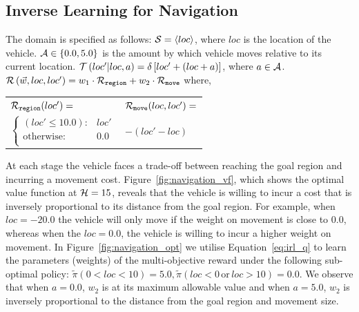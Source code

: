 \subsection{Inverse Learning for Navigation}
\label{sec:results_navigation}

The domain is specified as follows: {\footnotesize $ \mathcal{S} = \left\langle loc \right\rangle$}, where $ loc $ is the location of the vehicle. {\footnotesize $ \mathcal{A} \in \left\lbrace 0.0, 5.0 \right\rbrace $} is the amount by which vehicle moves relative to its current location. {\footnotesize $ \mathcal{T}\left( loc' | loc, a \right) = \delta \left[ loc' + (loc + a) \right] $}, where {\footnotesize $ a \in \mathcal{A} $}. {\footnotesize $ \mathcal{R}\left(\vec{w}, loc, loc'\right) = w_1 \cdot \mathcal{R}_{\mathtt{region}} + w_2 \cdot \mathcal{R}_{\mathtt{move}} $} where,

{\footnotesize 
    \abovedisplayskip=10pt
    \belowdisplayskip=0pt
    \renewcommand{\arraystretch}{1.5}
    \begin{tabular}{ll}    
        $ \mathcal{R}_{\mathtt{region}}(loc') = $ &  $ \mathcal{R}_{\mathtt{move}}(loc, loc') =  $ \\
        \qquad $ \begin{cases}
        (loc' \leq 10.0 ) : 				& loc' \\
        \text{otherwise} : 					& 0.0 \\
        \end{cases} $ 						& \qquad $ - (loc' - loc)  $\\
    \end{tabular}
} 

At each stage the vehicle faces a trade-off between reaching the goal region and incurring a movement cost. Figure~\ref{fig:navigation_vf}, which shows the optimal value function at {\footnotesize$ \mathcal{H} = 15 $}, reveals that the vehicle is willing to incur a cost that is inversely proportional to its distance from the goal region. For example, when {\footnotesize $loc = -20.0$} the vehicle will only move if the weight on movement is close to {\footnotesize $0.0$}, whereas when the {\footnotesize $loc = 0.0$}, the vehicle is willing to incur a higher weight on movement. In Figure~\ref{fig:navigation_opt} we utilise Equation~\eqref{eq:irl_q} to learn the parameters (weights) of the multi-objective reward under the following sub-optimal policy: {\footnotesize $ \tilde{\pi}(0 < loc < 10) = 5.0,  \tilde{\pi}(loc < 0 \,\mathrm{or}\, loc > 10) = 0.0$}. We observe that when {\footnotesize $a = 0.0$}, {\footnotesize $ w_2 $} is at its maximum allowable value and when {\footnotesize $a = 5.0$}, {\footnotesize $ w_2 $} is inversely proportional to the distance from the goal region and movement size. 

